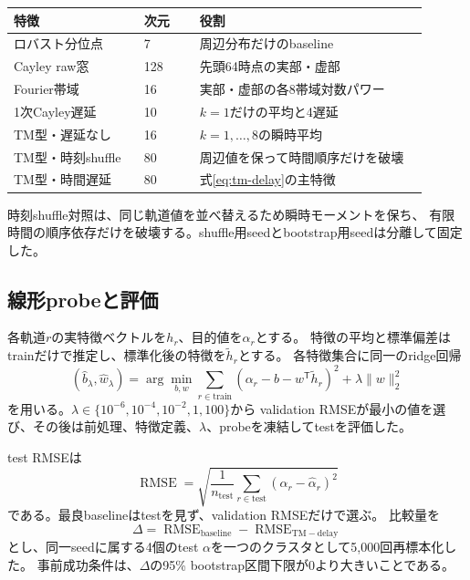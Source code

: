 \documentclass[a4paper,11pt]{jlreq}
\DeclareMathOperator{\RMSE}{RMSE}
\begin{document}
\begin{center}
\small
\begin{tabular}{p{0.29\linewidth}p{0.12\linewidth}p{0.49\linewidth}}
\toprule
特徴 & 次元 & 役割 \\
\midrule
ロバスト分位点 & 7 & 周辺分布だけのbaseline \\
Cayley raw窓 & 128 & 先頭64時点の実部・虚部 \\
Fourier帯域 & 16 & 実部・虚部の各8帯域対数パワー \\
1次Cayley遅延 & 10 & $k=1$だけの平均と4遅延 \\
TM型・遅延なし & 16 & $k=1,\ldots,8$の瞬時平均 \\
TM型・時刻shuffle & 80 & 周辺値を保って時間順序だけを破壊 \\
TM型・時間遅延 & 80 & 式\eqref{eq:tm-delay}の主特徴 \\
\bottomrule
\end{tabular}
\end{center}

時刻shuffle対照は、同じ軌道値を並べ替えるため瞬時モーメントを保ち、
有限時間の順序依存だけを破壊する。shuffle用seedとbootstrap用seedは分離して固定した。

\subsection{線形probeと評価}

各軌道$r$の実特徴ベクトルを$h_r$、目的値を$\alpha_r$とする。
特徴の平均と標準偏差はtrainだけで推定し、標準化後の特徴を$\widetilde h_r$とする。
各特徴集合に同一のridge回帰
\begin{equation}
    (\widehat b_{\lambda},\widehat w_{\lambda})
    =\arg\min_{b,w}
      \sum_{r\in\mathrm{train}}
      \left(\alpha_r-b-w^{\mathsf T}\widetilde h_r\right)^2
      +\lambda\|w\|_2^2
    \label{eq:ridge}
\end{equation}
を用いる。$\lambda\in\{10^{-6},10^{-4},10^{-2},1,100\}$から
validation RMSEが最小の値を選び、その後は前処理、特徴定義、$\lambda$、probeを凍結してtestを評価した。

test RMSEは
\begin{equation}
    \RMSE
    =\sqrt{\frac{1}{n_{\mathrm{test}}}
      \sum_{r\in\mathrm{test}}
      \left(\alpha_r-\widehat\alpha_r\right)^2}
    \label{eq:rmse}
\end{equation}
である。最良baselineはtestを見ず、validation RMSEだけで選ぶ。
比較量を
\begin{equation}
    \Delta
    =\RMSE_{\mathrm{baseline}}-\RMSE_{\mathrm{TM-delay}}
    \label{eq:rmse-difference}
\end{equation}
とし、同一seedに属する4個のtest $\alpha$を一つのクラスタとして5,000回再標本化した。
事前成功条件は、$\Delta$の95\% bootstrap区間下限が0より大きいことである。
\end{document}
